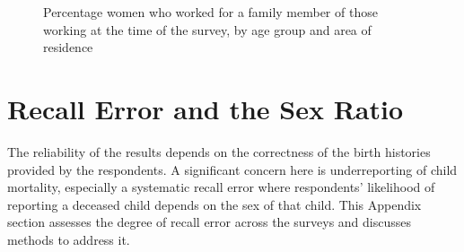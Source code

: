 \documentclass[12pt,letterpaper]{article}
\begin{document}
\begin{figure}[!htpb]
\centering
{}
\\
\\
\caption{Percentage women who worked for a family member of those 
working at the time of the survey, by age group and area of residence}
\label{fig:work_family_by_survey}
\end{figure}


\clearpage
\newpage

\section{Recall Error and the Sex Ratio}

\setcounter{figure}{0}
\setcounter{table}{0}

The reliability of the results depends on the correctness of the birth histories
provided by the respondents.
A significant concern here is underreporting of child mortality, especially a systematic
recall error where respondents' likelihood of reporting a deceased child depends on the 
sex of that child. 
This Appendix section assesses the degree of recall error across the surveys and discusses 
methods to address it.
\end{document}
